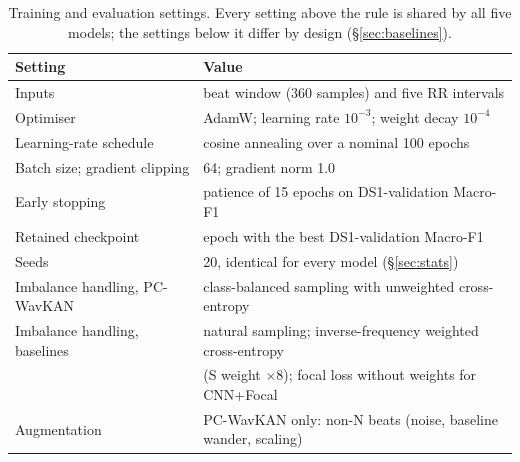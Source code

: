\documentclass[preprint,12pt]{elsarticle}
\begin{document}
\begin{table}[!htbp]
\centering
\caption{Training and evaluation settings. Every setting above the rule is shared by all five models; the settings below it differ by design (\S\ref{sec:baselines}).}
\label{tab:settings}
\footnotesize
\begin{tabular}{@{}ll@{}}
\toprule
\textbf{Setting} & \textbf{Value} \\ \midrule
Inputs & beat window (360 samples) and five RR intervals \\
Optimiser & AdamW; learning rate $10^{-3}$; weight decay $10^{-4}$ \\
Learning-rate schedule & cosine annealing over a nominal 100 epochs \\
Batch size; gradient clipping & 64; gradient norm 1.0 \\
Early stopping & patience of 15 epochs on DS1-validation Macro-F1 \\
Retained checkpoint & epoch with the best DS1-validation Macro-F1 \\
Seeds & 20, identical for every model (\S\ref{sec:stats}) \\ \midrule
Imbalance handling, PC-WavKAN & class-balanced sampling with unweighted cross-entropy \\
Imbalance handling, baselines & natural sampling; inverse-frequency weighted cross-entropy \\
 & (S weight $\times8$); focal loss without weights for CNN+Focal \\
Augmentation & PC-WavKAN only: non-N beats (noise, baseline wander, scaling) \\ \bottomrule
\end{tabular}
\end{table}
\end{document}
